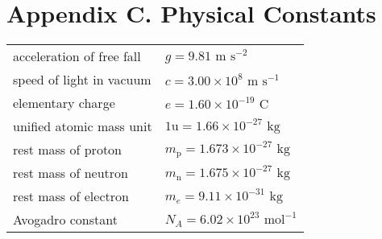 \chapter*{Appendix C. Physical Constants}

\vspace*{-2em}
{
{

\begin{longtable}{p{} p{}}
	acceleration of free fall & $g=9.81 \text{ m s}^{-2}$ \\
	speed of light in vacuum & $c = 3.00 \times 10^8 \text{ m s}^{-1}$ \\
	elementary charge & $e = 1.60\times10^{-19} \text{ C}$ \\
	unified atomic mass unit & $1 \text{u} = 1.66\times10^{-27} \text{ kg}$ \\
	rest mass of proton & $m_\text{p} = 1.673 \times 10^{-27} \text{ kg}$ \\
	rest mass of neutron & $m_\text{n} = 1.675 \times 10^{-27} \text{ kg}$ \\
	rest mass of electron & $m_e = 9.11 \times 10^{-31} \text{ kg}$ \\
	Avogadro constant & $N_A = 6.02 \times 10^{23} \text{ mol}^{-1}$ \\
\end{longtable} 

}\par}